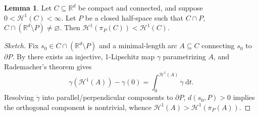 \documentclass[preprint, reqno]{amsart}
\theoremstyle{definition}
\newtheorem{lemma}[definition]{Lemma}
\numberwithin{equation}{section}
\begin{document}
\begin{lemma} \label{prop:h1-projection-contraction} Let $C \subseteq
  \mathbb R^d$ be compact and connected, and suppose $0 < \mathcal
  H^1(C) < \infty$. Let $P$ be a closed half-space such that $C \cap
  P$, $C \cap (\mathbb R^d \setminus P) \neq \varnothing$. Then
  $\mathcal H^1(\pi_P(C)) < \mathcal H^1(C)$.
\end{lemma}


\begin{proof}[Sketch]
  Fix $s_{0} \in C \cap (\mathbb R^d \setminus P)$ and a
  minimal-length arc $A \subseteq C$ connecting $s_0$ to $\partial P$.
  By \cite[Theorem\ 4.4.7]{ambrosio-tilli} there exists an injective,
  1-Lipschitz map $\gamma$ parametrizing $A$, and Rademacher's theorem
  gives
  \[
    \gamma(\mathcal H^1(A)) - \gamma(0) = \int_0^{\mathcal H^1(A)}
    \dot \gamma \ \mathrm{d}t.
  \]
  Resolving $\dot \gamma$ into parallel/perpendicular components to
  $\partial P$, $d(s_{0}, P) > 0$ implies the orthogonal component is
  nontrivial, whence $\mathcal H^1(A) > \mathcal H^1(\pi_P(A))$.
\end{proof}
\end{document}
